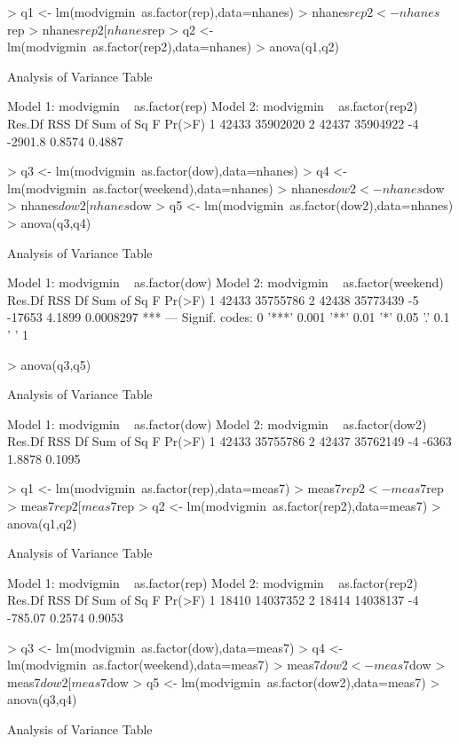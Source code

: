 \documentclass[11pt]{article}
\begin{document}
\begin{Schunk}
\begin{Sinput}
> q1 <- lm(modvigmin~as.factor(rep),data=nhanes)
> nhanes$rep2 <- nhanes$rep
> nhanes$rep2[nhanes$rep %in% c(1:5)] <- 1
> q2 <- lm(modvigmin~as.factor(rep2),data=nhanes)
> anova(q1,q2)
\end{Sinput}
\begin{Soutput}
Analysis of Variance Table

Model 1: modvigmin ~ as.factor(rep)
Model 2: modvigmin ~ as.factor(rep2)
  Res.Df      RSS Df Sum of Sq      F Pr(>F)
1  42433 35902020                           
2  42437 35904922 -4   -2901.8 0.8574 0.4887
\end{Soutput}
\begin{Sinput}
> q3 <- lm(modvigmin~as.factor(dow),data=nhanes)
> q4 <- lm(modvigmin~as.factor(weekend),data=nhanes)
> nhanes$dow2 <- nhanes$dow
> nhanes$dow2[nhanes$dow %in% c(2:6)] <- 2
> q5 <- lm(modvigmin~as.factor(dow2),data=nhanes)
> anova(q3,q4)
\end{Sinput}
\begin{Soutput}
Analysis of Variance Table

Model 1: modvigmin ~ as.factor(dow)
Model 2: modvigmin ~ as.factor(weekend)
  Res.Df      RSS Df Sum of Sq      F    Pr(>F)    
1  42433 35755786                                  
2  42438 35773439 -5    -17653 4.1899 0.0008297 ***
---
Signif. codes:  0 '***' 0.001 '**' 0.01 '*' 0.05 '.' 0.1 ' ' 1
\end{Soutput}
\begin{Sinput}
> anova(q3,q5)
\end{Sinput}
\begin{Soutput}
Analysis of Variance Table

Model 1: modvigmin ~ as.factor(dow)
Model 2: modvigmin ~ as.factor(dow2)
  Res.Df      RSS Df Sum of Sq      F Pr(>F)
1  42433 35755786                           
2  42437 35762149 -4     -6363 1.8878 0.1095
\end{Soutput}
\begin{Sinput}
> q1 <- lm(modvigmin~as.factor(rep),data=meas7)
> meas7$rep2 <- meas7$rep
> meas7$rep2[meas7$rep %in% c(1:5)] <- 1
> q2 <- lm(modvigmin~as.factor(rep2),data=meas7)
> anova(q1,q2)
\end{Sinput}
\begin{Soutput}
Analysis of Variance Table

Model 1: modvigmin ~ as.factor(rep)
Model 2: modvigmin ~ as.factor(rep2)
  Res.Df      RSS Df Sum of Sq      F Pr(>F)
1  18410 14037352                           
2  18414 14038137 -4   -785.07 0.2574 0.9053
\end{Soutput}
\begin{Sinput}
> q3 <- lm(modvigmin~as.factor(dow),data=meas7)
> q4 <- lm(modvigmin~as.factor(weekend),data=meas7)
> meas7$dow2 <- meas7$dow
> meas7$dow2[meas7$dow %in% c(2:6)] <- 2
> q5 <- lm(modvigmin~as.factor(dow2),data=meas7)
> anova(q3,q4)
\end{Sinput}
\begin{Soutput}
Analysis of Variance Table


\end{Soutput}
\end{Schunk}
\end{document}
